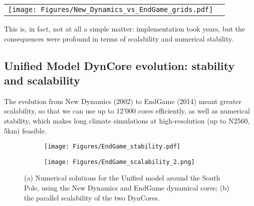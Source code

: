 \begin{tabular}{cc}
	\centering
	\texttt{[image: Figures/New\_Dynamics\_vs\_EndGame\_grids.pdf]}
\end{tabular}

This is, in fact, not at all a simple matter: implementation took years, but the consequences were profound in terms of scalability and numerical stability.

\subsection{Unified Model DynCore evolution: stability and scalability} 

The evolution from New Dynamics (2002) to EndGame (2014) meant greater scalability, so that we can use up to 12'000 cores efficiently, as well as numerical stability, which makes long climate simulations at high-resolution (up to N2560, 5km) feasible.

\begin{figure}[h!]
	\centering
	\begin{subfigure}[b]{0.9\textwidth}
		\texttt{[image: Figures/EndGame\_stability.pdf]}
		\caption{}
		\label{fig:UM-Instabilities} 
	\end{subfigure}
	\begin{subfigure}[b]{0.9\textwidth}
		\texttt{[image: Figures/EndGame\_scalability\_2.png]}
		\caption{}
		\label{fig:UM-scalablity}
	\end{subfigure}
	\caption{(a) Numerical solutions for the Unified model around the South Pole, using the New Dynamics and EndGame dynamical cores; (b) the parallel scalability of the two DynCores.}
\end{figure}
